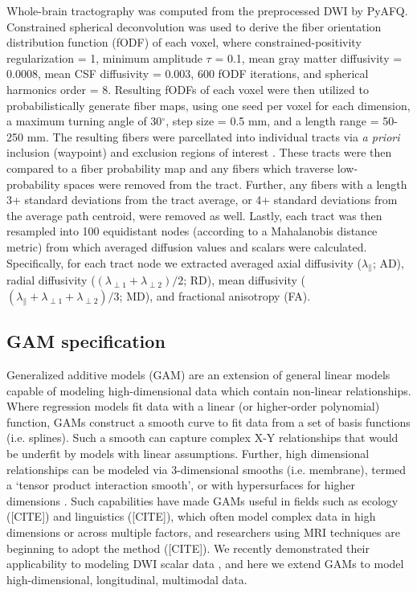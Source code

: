 \documentclass[12pt]{article}
\begin{document}
Whole-brain tractography was computed from the preprocessed DWI by PyAFQ. Constrained spherical deconvolution was used to derive the fiber orientation distribution function (fODF) of each voxel, where constrained-positivity regularization = 1, minimum amplitude $\tau$ = 0.1, mean gray matter diffusivity = 0.0008, mean CSF diffusivity = 0.003, 600 fODF iterations, and spherical harmonics order = 8. Resulting fODFs of each voxel were then utilized to probabilistically generate fiber maps, using one seed per voxel for each dimension, a maximum turning angle of 30$^\circ$, step size = 0.5 mm, and a length range = 50-250 mm. The resulting fibers were parcellated into individual tracts via \textit{a priori} inclusion (waypoint) and exclusion regions of interest \parencite{wakana2007ReproducibilityQuantitativeTractography}. These tracts were then compared to a fiber probability map \parencite{hua2008TractProbabilityMaps} and any fibers which traverse low-probability spaces were removed from the tract. Further, any fibers with a length 3+ standard deviations from the tract average, or 4+ standard deviations from the average path centroid, were removed as well. Lastly, each tract was then resampled into 100 equidistant nodes (according to a Mahalanobis distance metric) from which averaged diffusion values and scalars were calculated. Specifically, for each tract node we extracted averaged axial diffusivity ($\lambda_\parallel$; AD), radial diffusivity ($(\lambda_{\perp1}+\lambda_{\perp2})/2$; RD), mean diffusivity ($(\lambda_\parallel+\lambda_{\perp1}+\lambda_{\perp2})/3$; MD), and fractional anisotropy (FA).



\subsection{GAM specification}
\label{ssec:meth-gam}

Generalized additive models (GAM) are an extension of general linear models capable of modeling high-dimensional data which contain non-linear relationships. Where regression models fit data with a linear (or higher-order polynomial) function, GAMs construct a smooth curve to fit data from a set of basis functions (i.e. splines). Such a smooth can capture complex X-Y relationships that would be underfit by models with linear assumptions. Further, high dimensional relationships can be modeled via 3-dimensional smooths (i.e. membrane), termed a `tensor product interaction smooth', or with hypersurfaces for higher dimensions \parencite{baayen2020IntroductionGeneralizedAdditive}. Such capabilities have made GAMs useful in fields such as ecology ([CITE]) and linguistics ([CITE]), which often model complex data in high dimensions or across multiple factors, and researchers using MRI techniques are beginning to adopt the method ([CITE]). We recently demonstrated their applicability to modeling DWI scalar data \parencite{muncy2022GeneralAdditiveModels}, and here we extend GAMs to model high-dimensional, longitudinal, multimodal data.
\end{document}
